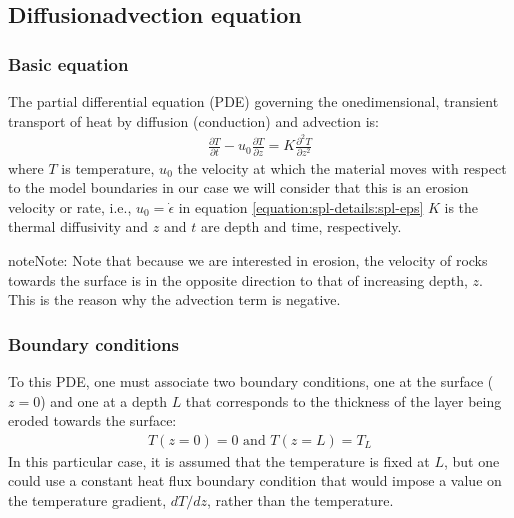 \documentclass[letterpaper,10pt,english]{jupyterBook}
\begin{document}
\sphinxstepscope


\subsection{Diffusion\sphinxhyphen{}advection equation}
\label{\detokenize{diffusion-advection:diffusion-advection-equation}}\label{\detokenize{diffusion-advection::doc}}

\subsubsection{Basic equation}
\label{\detokenize{diffusion-advection:basic-equation}}
\sphinxAtStartPar
The partial differential equation (PDE) governing the one\sphinxhyphen{}dimensional, transient transport of heat by diffusion (conduction) and advection is:
\begin{equation}\label{equation:diffusion-advection:heat}
\begin{split}\frac{\partial T}{\partial t}-u_0\frac{\partial T}{\partial z}=K\frac{\partial^2T}{\partial z^2}\end{split}
\end{equation}
\sphinxAtStartPar
where \(T\) is temperature, \(u_0\) the velocity at which the material moves with respect to the model boundaries \sphinxhyphen{} in our case we will consider that this is an erosion velocity or rate, i.e., \(u_0=\dot\epsilon\) in equation \eqref{equation:spl-details:spl-eps} \sphinxhyphen{} \(K\) is the thermal diffusivity and \(z\) and \(t\) are depth and time, respectively.

\begin{sphinxadmonition}{note}{Note:}
\sphinxAtStartPar
Note that because we are interested in erosion, the velocity of rocks towards the surface is in the opposite direction to that of increasing depth, \(z\). This is the reason why the advection term is negative.
\end{sphinxadmonition}


\subsubsection{Boundary conditions}
\label{\detokenize{diffusion-advection:boundary-conditions}}
\sphinxAtStartPar
To this PDE, one must associate two boundary conditions, one at the surface (\(z=0\)) and one at a depth \(L\) that corresponds to the thickness of the layer being eroded towards the surface:
\begin{equation}\label{equation:diffusion-advection:heat-bc}
\begin{split}T(z=0)=0 \textrm{ and }T(z=L)=T_L\end{split}
\end{equation}
\sphinxAtStartPar
In this particular case, it is assumed that the temperature is fixed at \(L\), but one could use a constant heat flux boundary condition that would impose a value on the temperature gradient, \(dT/dz\), rather than the temperature.
\end{document}
